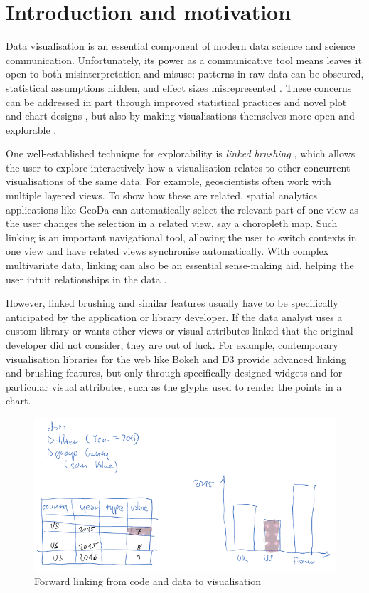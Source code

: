 \section{Introduction and motivation}

Data visualisation is an essential component of modern data science and science
communication. Unfortunately, its power as a communicative tool means leaves it
open to both misinterpretation and misuse: patterns in raw data can be obscured,
statistical assumptions hidden, and effect sizes misrepresented
\cite{weissgerber15}. These concerns can be addressed in part through improved
statistical practices and novel plot and chart designs \cite{allen19}, but also
by making visualisations themselves more open and explorable
\cite{dragicevic19}.

One well-established technique for explorability is \emph{linked brushing}
\cite{fisherkeller75,becker87,buja91}, which allows the user to explore
interactively how a visualisation relates to other concurrent visualisations of
the same data. For example, geoscientists often work with multiple layered
views. To show how these are related, spatial analytics applications like GeoDa
\cite{anselin06} can automatically select the relevant part of one view as the
user changes the selection in a related view, say a choropleth map. Such linking
is an important navigational tool, allowing the user to switch contexts in one
view and have related views synchronise automatically. With complex multivariate
data, linking can also be an essential sense-making aid, helping the user intuit
relationships in the data \cite{he18}.

However, linked brushing and similar features usually have to be specifically
anticipated by the application or library developer. If the data analyst uses a
custom library or wants other views or visual attributes linked that the
original developer did not consider, they are out of luck. For example,
contemporary visualisation libraries for the web like Bokeh \cite{jolly18} and
D3 \cite{bostock11} provide advanced linking and brushing features, but only
through specifically designed widgets and for particular visual attributes, such
as the glyphs used to render the points in a chart.

\begin{figure}[h]
\includegraphics[scale=0.35]{image/chart-fwd}
\caption{Forward linking from code and data to visualisation}
\end{figure}

